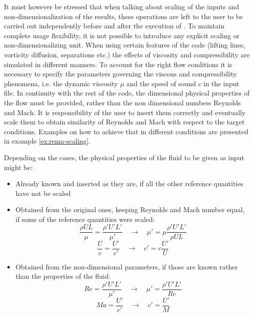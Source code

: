 It must however be stressed that when talking about scaling of the inputs and non-dimensionalization of the results, these operations are left to the user to be carried out independently before and after the execution of \DUST{}. To maintain complete usage flexibility, it is not possible to introduce any explicit scaling or non-dimensionalizing unit. 
When using certain features of the code (lifting lines, vorticity diffusion, separations etc.) the effects of viscosity and compressibility are simulated in different manners. To account for the right flow conditions it is necessary to specify the parameters governing the viscous and compressibility phenomena, i.e. the dynamic viscosity $\mu$ and the speed of sound $c$ in the input file. In continuity with the rest of the code, the dimensional physical properties of the flow must be provided, rather than the non dimensional numbers Reynolds and Mach. It is responsibility of the user to insert them correctly and eventually scale them to obtain similarity of Reynolds and Mach with respect to the target conditions. Examples on how to achieve that in different conditions are presented in example \ref{ex:rema-scaling}.

\begin{example}
\label{ex:rema-scaling}
Depending on the cases, the physical properties of the fluid to be given as input might be:
\begin{itemize}
    \item Already known and inserted as they are, if all the other reference quantities have not be scaled
    \item Obtained from the original ones, keeping Reynolds and Mach number equal, if some of the reference quantities were scaled:
    \begin{equation*}
        \frac{\rho U L}{\mu} = \frac{\rho' U' L'}{\mu'} \quad \rightarrow \quad \mu' = \mu \frac{\rho' U' L'}{\rho U L}
    \end{equation*}
    \begin{equation*}
        \frac{U}{c} = \frac{U'}{c'} \quad \rightarrow \quad c' = c \frac{U'}{U}
    \end{equation*}
    \item Obtained from the non-dimensional parameters, if those are known rather than the properties of the fluid:
        \begin{equation*}
       Re = \frac{\rho' U' L'}{\mu'} \quad \rightarrow \quad \mu' = \frac{\rho' U' L'}{Re}
    \end{equation*}
    \begin{equation*}
        Ma = \frac{U'}{c'} \quad \rightarrow \quad c' = \frac{U'}{M}
    \end{equation*}
\end{itemize}
\end{example}

